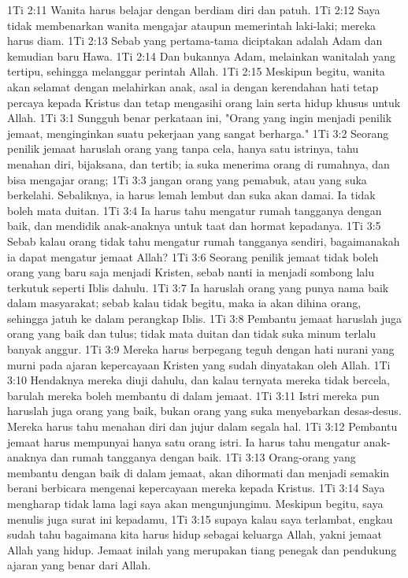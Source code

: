 1Ti 2:11  Wanita harus belajar dengan berdiam diri dan patuh.
1Ti 2:12  Saya tidak membenarkan wanita mengajar ataupun memerintah laki-laki; mereka harus diam.
1Ti 2:13  Sebab yang pertama-tama diciptakan adalah Adam dan kemudian baru Hawa.
1Ti 2:14  Dan bukannya Adam, melainkan wanitalah yang tertipu, sehingga melanggar perintah Allah.
1Ti 2:15  Meskipun begitu, wanita akan selamat dengan melahirkan anak, asal ia dengan kerendahan hati tetap percaya kepada Kristus dan tetap mengasihi orang lain serta hidup khusus untuk Allah.
1Ti 3:1  Sungguh benar perkataan ini, "Orang yang ingin menjadi penilik jemaat, menginginkan suatu pekerjaan yang sangat berharga."
1Ti 3:2  Seorang penilik jemaat haruslah orang yang tanpa cela, hanya satu istrinya, tahu menahan diri, bijaksana, dan tertib; ia suka menerima orang di rumahnya, dan bisa mengajar orang;
1Ti 3:3  jangan orang yang pemabuk, atau yang suka berkelahi. Sebaliknya, ia harus lemah lembut dan suka akan damai. Ia tidak boleh mata duitan.
1Ti 3:4  Ia harus tahu mengatur rumah tangganya dengan baik, dan mendidik anak-anaknya untuk taat dan hormat kepadanya.
1Ti 3:5  Sebab kalau orang tidak tahu mengatur rumah tangganya sendiri, bagaimanakah ia dapat mengatur jemaat Allah?
1Ti 3:6  Seorang penilik jemaat tidak boleh orang yang baru saja menjadi Kristen, sebab nanti ia menjadi sombong lalu terkutuk seperti Iblis dahulu.
1Ti 3:7  Ia haruslah orang yang punya nama baik dalam masyarakat; sebab kalau tidak begitu, maka ia akan dihina orang, sehingga jatuh ke dalam perangkap Iblis.
1Ti 3:8  Pembantu jemaat haruslah juga orang yang baik dan tulus; tidak mata duitan dan tidak suka minum terlalu banyak anggur.
1Ti 3:9  Mereka harus berpegang teguh dengan hati nurani yang murni pada ajaran kepercayaan Kristen yang sudah dinyatakan oleh Allah.
1Ti 3:10  Hendaknya mereka diuji dahulu, dan kalau ternyata mereka tidak bercela, barulah mereka boleh membantu di dalam jemaat.
1Ti 3:11  Istri mereka pun haruslah juga orang yang baik, bukan orang yang suka menyebarkan desas-desus. Mereka harus tahu menahan diri dan jujur dalam segala hal.
1Ti 3:12  Pembantu jemaat harus mempunyai hanya satu orang istri. Ia harus tahu mengatur anak-anaknya dan rumah tangganya dengan baik.
1Ti 3:13  Orang-orang yang membantu dengan baik di dalam jemaat, akan dihormati dan menjadi semakin berani berbicara mengenai kepercayaan mereka kepada Kristus.
1Ti 3:14  Saya mengharap tidak lama lagi saya akan mengunjungimu. Meskipun begitu, saya menulis juga surat ini kepadamu,
1Ti 3:15  supaya kalau saya terlambat, engkau sudah tahu bagaimana kita harus hidup sebagai keluarga Allah, yakni jemaat Allah yang hidup. Jemaat inilah yang merupakan tiang penegak dan pendukung ajaran yang benar dari Allah.
